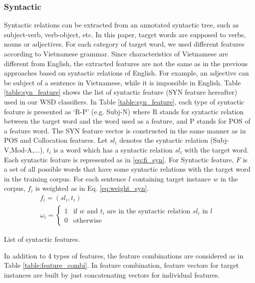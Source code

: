 \documentclass[english]{jnlp_1.4}
\begin{document}
\subsubsection{Syntactic}
Syntactic relations can be extracted from an annotated syntactic tree, such as subject-verb, verb-object, etc. 
In this paper, target words are supposed to verbs, nouns or adjectives.
For each category of target word, we used different features according to Vietnamese grammar. 
Since characteristics of Vietnamese are different from English, 
the extracted features are not the same as in the previous approaches based on syntactic relations of English.
For example, an adjective can be subject of a sentence in Vietnamese, while it is impossible in English.
Table \ref{table:syn_feature} shows the list of syntactic feature (SYN feature hereafter) used in our WSD classifiers.
In Table \ref{table:syn_feature},
each type of syntactic feature is presented as `R-P' (e.g. Subj-N)
where R stands for syntactic relation between the target word and the word used as a feature, 
and P stands for POS of a feature word.
The SYN feature vector is constructed in the same manner as in POS and Collocation features. 
Let $sl_{i}$ denotes the syntactic relation (Subj-V,Mod-A,...), 
$t_{i}$ is a word which has a syntactic relation $sl_{i}$ with the target word. 
Each syntactic feature is represented as in \eqref{eq:fi_syn}. 
For Syntactic feature, $F$ is a set of all possible words that have some syntactic relations with the target word in the training corpus. 
For each sentence $l$ containing target instance $w$ in the corpus, $f_i$ is weighted as in Eq. \eqref{eq:weight_syn}.
\begin{gather}
 \label{eq:fi_syn}
f_{i}=(sl_{i},t_{i}) \\
 \label{eq:weight_syn}
 \omega_{i} = \left \{ \begin{array}{ll} 1 & \mbox{if $w$ and $t_{i}$ are in the syntactic relation $sl_{i}$ in $l$}\\ 0 & \mbox{otherwise} \end{array} \right.
\end{gather}

\begin{table}[t]
\caption{List of syntactic features.}
\label{table:syn_feature}

\end{table}


In addition to 4 types of features, the feature combinations are considered as in Table \ref{table:feature_combi}.
In feature combination, feature vectors for target instances are built by just concatenating vectors for individual features.
\end{document}
